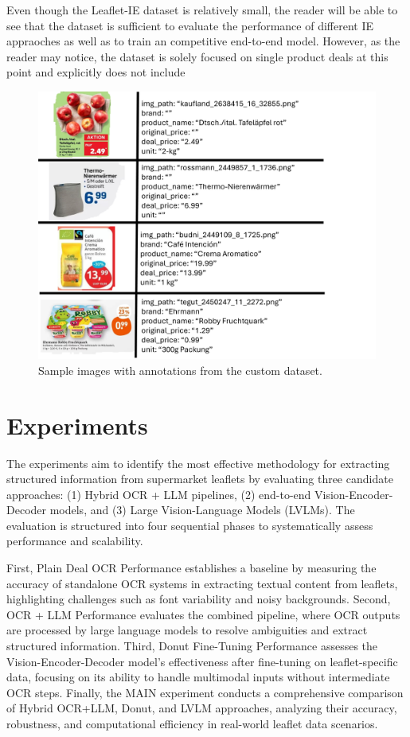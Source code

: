 \documentclass[11pt]{article}
\begin{document}
Even though the Leaflet-IE dataset is relatively small, the reader will be able to see that the dataset is sufficient to evaluate the performance of different IE appraoches as well as to train an competitive end-to-end model. However, as the reader may notice, the dataset is solely focused on single product deals at this point and explicitly does not include 

\begin{figure}[h!]
\centering
\includegraphics[width=0.8\linewidth]{figures/ie_samples.png}
\caption{Sample images with annotations from the custom dataset.}
\label{fig:ie_dataset_samples}
\end{figure}

\section{Experiments}

The experiments aim to identify the most effective methodology for extracting structured information from supermarket leaflets by evaluating three candidate approaches: (1) Hybrid OCR + LLM pipelines, (2) end-to-end Vision-Encoder-Decoder models, and (3) Large Vision-Language Models (LVLMs). The evaluation is structured into four sequential phases to systematically assess performance and scalability.

First, Plain Deal OCR Performance establishes a baseline by measuring the accuracy of standalone OCR systems in extracting textual content from leaflets, highlighting challenges such as font variability and noisy backgrounds. Second, OCR + LLM Performance evaluates the combined pipeline, where OCR outputs are processed by large language models to resolve ambiguities and extract structured information. Third, Donut Fine-Tuning Performance assesses the Vision-Encoder-Decoder model's effectiveness after fine-tuning on leaflet-specific data, focusing on its ability to handle multimodal inputs without intermediate OCR steps. Finally, the MAIN experiment conducts a comprehensive comparison of Hybrid OCR+LLM, Donut, and LVLM approaches, analyzing their accuracy, robustness, and computational efficiency in real-world leaflet data scenarios.
\end{document}
